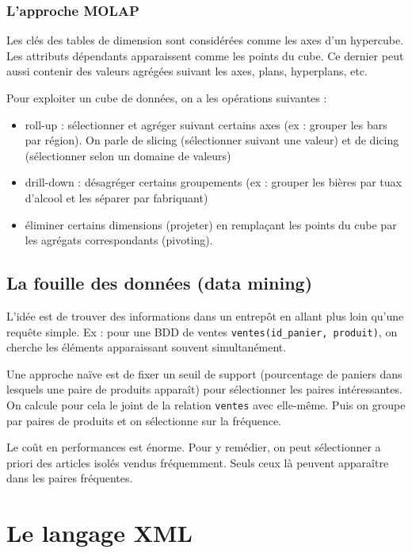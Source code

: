 			
			\subsubsection{L'approche MOLAP}
			
			Les clés des tables de dimension sont considérées comme les axes d'un hypercube. Les attributs dépendants apparaissent comme les points du cube. Ce dernier peut aussi contenir des valeurs agrégées suivant les axes, plans, hyperplans, etc.
			
			Pour exploiter un cube de données, on a les opérations suivantes :
			
			\begin{itemize}
				\item roll-up : sélectionner et agréger suivant certains axes (ex : grouper les bars par région). On parle de slicing (sélectionner suivant une valeur) et de dicing (sélectionner selon un domaine de valeurs)
				\item drill-down : désagréger certains groupements (ex : grouper les bières par tuax d'alcool et les séparer par fabriquant)
				\item éliminer certains dimensions (projeter) en remplaçant les points du cube par les agrégats correspondants (pivoting).
			\end{itemize}	
				
		\subsection{La fouille des données (data mining)}
		
		L'idée est de trouver des informations dans un entrepôt en allant plus loin qu'une requête simple. Ex : pour une BDD de ventes \texttt{ventes(id\_panier, produit)}, on cherche les éléments apparaissant souvent simultanément.
		
		Une approche naïve est de fixer un seuil de support (pourcentage de paniers dans lesquels une paire de produits apparaît) pour sélectionner les paires intéressantes. On calcule pour cela le joint de la relation \texttt{ventes} avec elle-même. Puis on groupe par paires de produits et on sélectionne sur la fréquence.
		
		Le coût en performances est énorme. Pour y remédier, on peut sélectionner a priori des articles isolés vendus fréquemment. Seuls ceux là peuvent apparaître dans les paires fréquentes.
		
		
	\section{Le langage XML}
	
